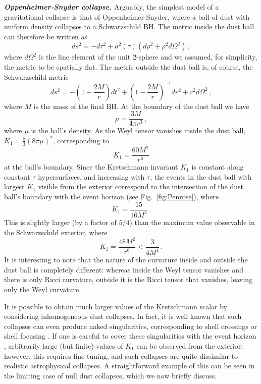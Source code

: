 \documentclass[floats,floatfix,showpacs,amssymb,prd,twocolumn,superscriptaddress,nofootinbib,nolongbibliography,reprint]{revtex4-2}
\begin{document}
\noindent
{\bf \em Oppenheimer-Snyder collapse.}
Arguably, the simplest model of a gravitational collapse is that of Oppenheimer-Snyder, where a ball of dust with uniform density collapses to a Schwarzschild BH. The metric inside the dust ball can therefore be written as
\begin{equation}
ds^2 = - d\tau^2 + a^2(\tau) (d\rho^2 + \rho^2 d \Omega^2) \, ,
\end{equation}
where $d \Omega^2$ is the line element of the unit $2$-sphere and we assumed, for simplicity, the metric to be spatially flat. The metric outside the dust ball is, of course, the Schwarzschild metric
\begin{equation}
ds^2 = -\left(1 - \frac{2M}{r}\right) dt^2 + \left(1 - \frac{2M}{r}\right)^{-1} dr^2 + r^2 d \Omega^2 \, ,
\end{equation}
where $M$ is the mass of the final BH. At the boundary of the dust ball we have \cite{Natario21}
\begin{equation}
\mu = \frac{3M}{4\pi r^3} \, ,
\end{equation}
where $\mu$ is the ball's density. As the Weyl tensor vanishes inside the dust ball, $K_1= \frac53 (8 \pi \mu)^2$, corresponding to
%
\begin{equation}
K_1 = \frac{60M^2}{r^6}
\end{equation}
at the ball's boundary.
Since the Kretschmann invariant $K_1$ is constant along constant $\tau$ hypersurfaces, and increasing with $\tau$, the events in the dust ball with largest $K_1$ visible from the exterior correspond to the intersection of the dust ball's boundary with the event horizon (see Fig.~\ref{fig:Penrose}), where 
%
\begin{equation}
K_1 = \frac{15}{16M^4} \, .
\end{equation}
%
This is slightly larger (by a factor of $5/4$) than the maximum value observable in the Schwarzschild exterior, where
%
\begin{equation}
K_1 = \frac{48M^2}{r^6} < \frac{3}{4M^4} \, .\label{K1_Sch}
\end{equation}
%
It is interesting to note that the nature of the curvature inside and outside the dust ball is completely different: whereas inside the Weyl tensor vanishes and there is only Ricci curvature, outside it is the Ricci tensor that vanishes, leaving only the Weyl curvature.

It is possible to obtain much larger values of the Kretschmann scalar by considering inhomogeneous dust collapses. In fact, it is well known that such collapses can even produce naked singularities, corresponding to shell crossings or shell focusing \cite{EardleySmarr:1979, Christodoulou:1984}. If one is careful to cover these singularities with the event horizon \cite{JoshiMalafarina:2015}, arbitrarily large (but finite) values of $K_1$ can be observed from the exterior; however, this requires fine-tuning, and such collapses are quite dissimilar to realistic astrophysical collapses. A straightforward example of this can be seen in the limiting case of null dust collapses, which we now briefly discuss.
\end{document}
